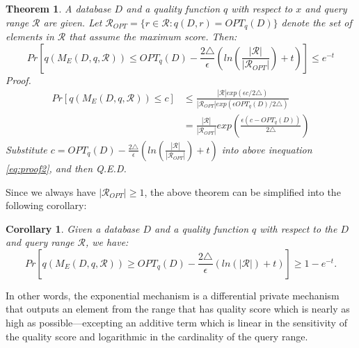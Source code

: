 \documentclass[a4paper, 11pt]{article} %
\newtheorem{theorem}{Theorem}
\newtheorem{corollary}{Corollary}[theorem]
\begin{document}
\begin{theorem}
A database $D$ and a quality function $q$ with respect to $x$ and query range $\mathcal{R}$ are given. Let $\mathcal{R}_{OPT} =\{r \in \mathcal{R}: q(D, r) = OPT_q(D) \}$ denote the set of elements in $\mathcal{R}$ that assume the maximum score. Then:
\begin{equation}
Pr \left[q(M_E(D, q, \mathcal{R}))
\leq OPT_q(D) - \frac{2\triangle}{\epsilon}
\left(
ln \left( \frac{|\mathcal{R}|}{|\mathcal{R}_{OPT}|} \right) + t
\right) \right]
 \leq e^{-t}
\end{equation}
\textit{Proof. }
\begin{align}  \label{eq:proof2}
Pr[q(M_E(D, q, \mathcal{R})) \leq c]
& \leq \frac{
|\mathcal{R}| exp(\epsilon c / 2 \triangle)
}{
|\mathcal{R}_{OPT}| exp(\epsilon OPT_q(D) / 2 \triangle)
} \\
&= \frac{|\mathcal{R}| }{ | \mathcal{R}_{OPT} | }
exp(
\frac{\epsilon ( c - OPT_q(D)  ) }{2 \triangle}
)
\end{align}
Substitute $c = OPT_q(D) - \frac{2\triangle}{\epsilon}
\left(
ln \left( \frac{|\mathcal{R}|}{|\mathcal{R}_{OPT}|} \right) + t
\right)
$ into above inequation \ref{eq:proof2}, and then Q.E.D.
\end{theorem}
Since we always have $|\mathcal{R}_{OPT}| \geq 1$, the above theorem can be simplified into the following corollary:
\begin{corollary}
Given a database $D$ and a quality function $q$ with respect to the $D$ and query range $\mathcal{R}$, we have:
\begin{equation}
Pr[q(M_E(D, q, \mathcal{R}))  \geq
OPT_q(D) - \frac{2 \triangle}{\epsilon} (ln(| \mathcal{R}|) + t)]
\geq 1-e^{-t}.
\end{equation}
\end{corollary}
In other words, the exponential mechanism is a differential private mechanism that outputs an element from the range that has quality score which is nearly as high as possible---excepting an additive term which is linear in the sensitivity of the quality score and logarithmic in the cardinality of the query range.
\end{document}
